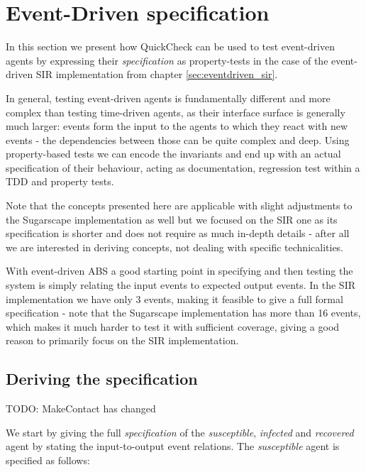 \section{Event-Driven specification}
In this section we present how QuickCheck can be used to test event-driven agents by expressing their \textit{specification} as property-tests in the case of the event-driven SIR implementation from chapter \ref{sec:eventdriven_sir}.

In general, testing event-driven agents is fundamentally different and more complex than testing time-driven agents, as their interface surface is generally much larger: events form the input to the agents to which they react with new events - the dependencies between those can be quite complex and deep. Using property-based tests we can encode the invariants and end up with an actual specification of their behaviour, acting as documentation, regression test within a TDD and property tests.

Note that the concepts presented here are applicable with slight adjustments to the Sugarscape implementation as well but we focused on the SIR one as its specification is shorter and does not require as much in-depth details - after all we are interested in deriving concepts, not dealing with specific technicalities.

With event-driven ABS a good starting point in specifying and then testing the system is simply relating the input events to expected output events. In the SIR implementation we have only 3 events, making it feasible to give a full formal specification - note that the Sugarscape implementation has more than 16 events, which makes it much harder to test it with sufficient coverage, giving a good reason to primarily focus on the SIR implementation. 

\subsection{Deriving the specification}
TODO: MakeContact has changed

We start by giving the full \textit{specification} of the \textit{susceptible}, \textit{infected} and \textit{recovered} agent by stating the input-to-output event relations. The \textit{susceptible} agent is specified as follows:


